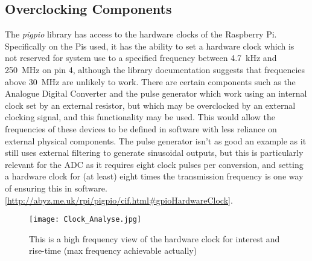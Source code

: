 \documentclass[../main.tex]{subfiles}
\begin{document}
\subsection{Overclocking Components}

The \textit{pigpio} library has access to the hardware clocks of the Raspberry Pi.
Specifically on the Pis used, it has the ability to set a hardware clock which is not reserved for system use to a specified frequency between \SI{4.7}{\kilo\hertz} and \SI{250}{\mega\hertz} on pin 4, although the library documentation suggests that frequencies above \SI{30}{\mega\hertz} are unlikely to work.
There are certain components such as the Analogue Digital Converter and the pulse generator which work using an internal clock set by an external resistor, but which may be overclocked by an external clocking signal, and this functionality may be used.
This would allow the frequencies of these devices to be defined in software with less reliance on external physical components.
The pulse generator isn't as good an example as it still uses external filtering to generate sinusoidal outputs, but this is particularly relevant for the ADC as it requires eight clock pulses per conversion, and setting a hardware clock for (at least) eight times the transmission frequency is one way of ensuring this in software.\\
\ref{http://abyz.me.uk/rpi/pigpio/cif.html#gpioHardwareClock}.
\begin{figure}[ht]
	\centering
	\texttt{[image: Clock\_Analyse.jpg]}
	\caption{This is a high frequency view of the hardware clock for interest and rise-time (max frequency achievable actually)}
\end{figure}
\end{document}

